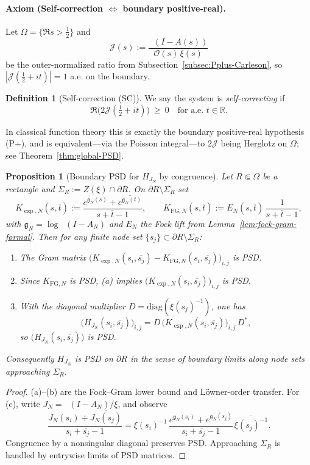 \documentclass[11pt]{article}
\newtheorem{proposition}[theorem]{Proposition}
\theoremstyle{definition}
\newtheorem{definition}[theorem]{Definition}
\theoremstyle{remark}
\newcommand{\R}{\mathbb{R}}
\DeclareMathOperator{\dettwo}{det_2}
\begin{document}
\paragraph{Axiom (Self-correction $\Leftrightarrow$ boundary positive-real).}
Let \(\Omega=\{\Re s>\tfrac12\}\) and
\[\mathcal J(s):=\frac{\dettwo(I-A(s))}{\mathcal O(s)\,\xi(s)}\]
be the outer-normalized ratio from Subsection~\ref{subsec:Pplus-Carleson}, so $|\mathcal J(\tfrac12+it)|=1$ a.e. on the boundary. 
\begin{definition}[Self-correction (SC)]\label{def:SC}
We say the system is \emph{self-correcting} if
\[\Re\bigl(2\mathcal J(\tfrac12+it)\bigr)\ \ge\ 0\quad\text{for a.e. }t\in\R.\]
\end{definition}
In classical function theory this is exactly the boundary positive-real hypothesis (P+), and is equivalent—via the Poisson integral—to $2\mathcal J$ being Herglotz on $\Omega$; see Theorem~\ref{thm:global-PSD}.
\begin{proposition}[Boundary PSD for $H_{J_N}$ by congruence]\label{prop:boundary-psd-fixed}
Let $R\Subset\Omega$ be a rectangle and $\Sigma_R:=Z(\xi)\cap\partial R$. On $\partial R\setminus\Sigma_R$ set
\[
K_{\exp,N}(s,\bar t):=\frac{e^{\mathfrak g_N(s)}+\overline{e^{\mathfrak g_N(t)}}}{s+\bar t-1},\qquad 
K_{\mathrm{FG},N}(s,\bar t):=E_N(s,\bar t)\,\frac{1}{s+\bar t-1},
\]
with $\mathfrak g_N=\log\dettwo(I-A_N)$ and $E_N$ the Fock lift from Lemma~\ref{lem:fock-gram-formal}. Then for any finite node set $\{s_j\}\subset\partial R\setminus\Sigma_R$:
\begin{enumerate}
\item[\textup{(a)}] The Gram matrix $\big(K_{\exp,N}(s_i,\overline{s_j})-K_{\mathrm{FG},N}(s_i,\overline{s_j})\big)_{i,j}$ is PSD.
\item[\textup{(b)}] Since $K_{\mathrm{FG},N}$ is PSD, (a) implies $\big(K_{\exp,N}(s_i,\overline{s_j})\big)_{i,j}$ is PSD.
\item[\textup{(c)}] With the diagonal multiplier $D=\mathrm{diag}(\xi(s_j)^{-1})$, one has
\[
\Big(H_{J_N}(s_i,\overline{s_j})\Big)_{i,j}=D\,\Big(K_{\exp,N}(s_i,\overline{s_j})\Big)_{i,j}\,D^{*},
\]
so $\big(H_{J_N}(s_i,\overline{s_j})\big)$ is PSD.
\end{enumerate}
Consequently $H_{J_N}$ is PSD on $\partial R$ in the sense of boundary limits along node sets approaching $\Sigma_R$.
\end{proposition}
\begin{proof}
(a)–(b) are the Fock–Gram lower bound and Löwner-order transfer. For (c), write $J_N=\dettwo(I-A_N)/\xi$, and observe
\[\frac{J_N(s_i)+\overline{J_N(s_j)}}{s_i+\overline{s_j}-1}=\xi(s_i)^{-1}\,\frac{e^{\mathfrak g_N(s_i)}+\overline{e^{\mathfrak g_N(s_j)}}}{s_i+\overline{s_j}-1}\,\overline{\xi(s_j)^{-1}}.\]
Congruence by a nonsingular diagonal preserves PSD. Approaching $\Sigma_R$ is handled by entrywise limits of PSD matrices.
\end{proof}
\end{document}
